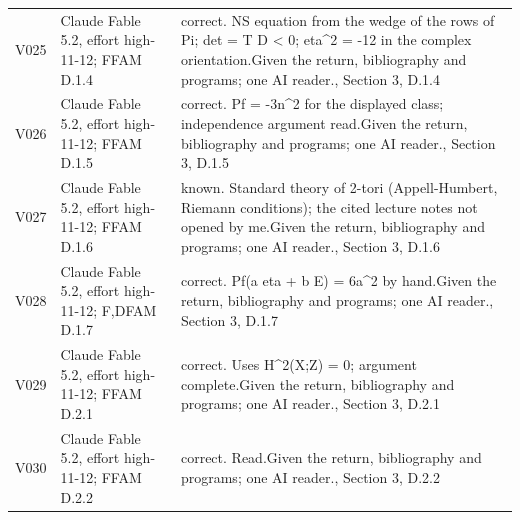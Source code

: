 \begin{longtable}{@{}L{.08\linewidth}L{.31\linewidth}L{.56\linewidth}@{}}
V025 & Claude Fable 5.2, effort high-11-12; F\newline FAM D.1.4 & correct. NS equation from the wedge of the rows of Pi; det = T D < 0; eta\textasciicircum{}2 = -12 in the complex orientation.\newline Given the return, bibliography and programs; one AI reader.\newline {}, Section 3, D.1.4\\
V026 & Claude Fable 5.2, effort high-11-12; F\newline FAM D.1.5 & correct. Pf = -3n\textasciicircum{}2 for the displayed class; independence argument read.\newline Given the return, bibliography and programs; one AI reader.\newline {}, Section 3, D.1.5\\
V027 & Claude Fable 5.2, effort high-11-12; F\newline FAM D.1.6 & known. Standard theory of 2-tori (Appell-Humbert, Riemann conditions); the cited lecture notes not opened by me.\newline Given the return, bibliography and programs; one AI reader.\newline {}, Section 3, D.1.6\\
V028 & Claude Fable 5.2, effort high-11-12; F,D\newline FAM D.1.7 & correct. Pf(a eta + b E) = 6a\textasciicircum{}2 by hand.\newline Given the return, bibliography and programs; one AI reader.\newline {}, Section 3, D.1.7\\
V029 & Claude Fable 5.2, effort high-11-12; F\newline FAM D.2.1 & correct. Uses H\textasciicircum{}2(X;Z) = 0; argument complete.\newline Given the return, bibliography and programs; one AI reader.\newline {}, Section 3, D.2.1\\
V030 & Claude Fable 5.2, effort high-11-12; F\newline FAM D.2.2 & correct. Read.\newline Given the return, bibliography and programs; one AI reader.\newline {}, Section 3, D.2.2\\

\end{longtable}
